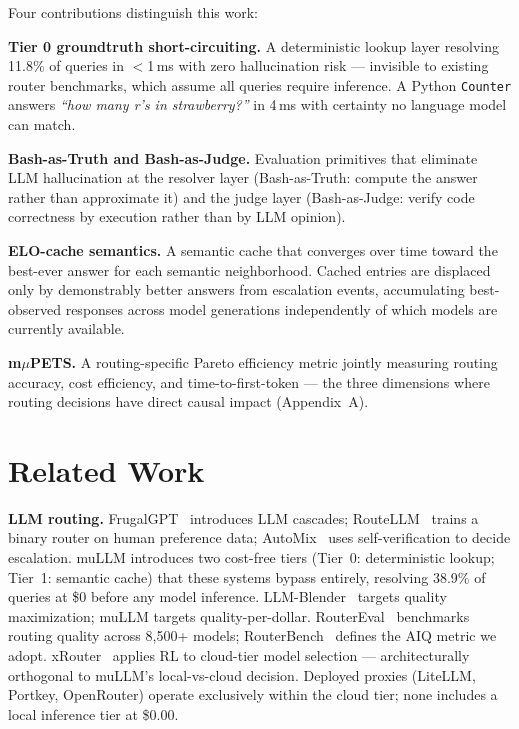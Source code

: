 \documentclass[11pt]{article}
\begin{document}
Four contributions distinguish this work:

\textbf{Tier 0 groundtruth short-circuiting.} A deterministic lookup
layer resolving 11.8\% of queries in $<$1\,ms with zero hallucination
risk --- invisible to existing router benchmarks, which assume all
queries require inference. A Python \texttt{Counter} answers
\textit{``how many r's in strawberry?''} in 4\,ms with certainty no
language model can match.

\textbf{Bash-as-Truth and Bash-as-Judge.} Evaluation primitives that
eliminate LLM hallucination at the resolver layer (Bash-as-Truth:
compute the answer rather than approximate it) and the judge layer
(Bash-as-Judge: verify code correctness by execution rather than by
LLM opinion).

\textbf{ELO-cache semantics.} A semantic cache that converges over time
toward the best-ever answer for each semantic neighborhood. Cached
entries are displaced only by demonstrably better answers from
escalation events, accumulating best-observed responses across model
generations independently of which models are currently available.

\textbf{m$\mu$PETS.} A routing-specific Pareto efficiency metric
jointly measuring routing accuracy, cost efficiency, and
time-to-first-token --- the three dimensions where routing decisions
have direct causal impact (Appendix~A).

\section{Related Work}

\textbf{LLM routing.}  FrugalGPT~\cite{chen2023frugalgpt} introduces
LLM cascades; RouteLLM~\cite{ong2024routellm} trains a binary router on
human preference data; AutoMix~\cite{madaan2023automix} uses
self-verification to decide escalation. muLLM introduces two cost-free
tiers (Tier~0: deterministic lookup; Tier~1: semantic cache) that these
systems bypass entirely, resolving 38.9\% of queries at \$0 before any
model inference. LLM-Blender~\cite{jiang2023llmblender} targets quality
maximization; muLLM targets quality-per-dollar. RouterEval~\cite{huang2025routereval}
benchmarks routing quality across 8,500+ models; RouterBench~\cite{withmartian2024routerbench}
defines the AIQ metric we adopt. xRouter~\cite{salesforce2025xrouter}
applies RL to cloud-tier model selection --- architecturally orthogonal
to muLLM's local-vs-cloud decision. Deployed proxies (LiteLLM, Portkey,
OpenRouter) operate exclusively within the cloud tier; none includes a
local inference tier at \$0.00.
\end{document}
